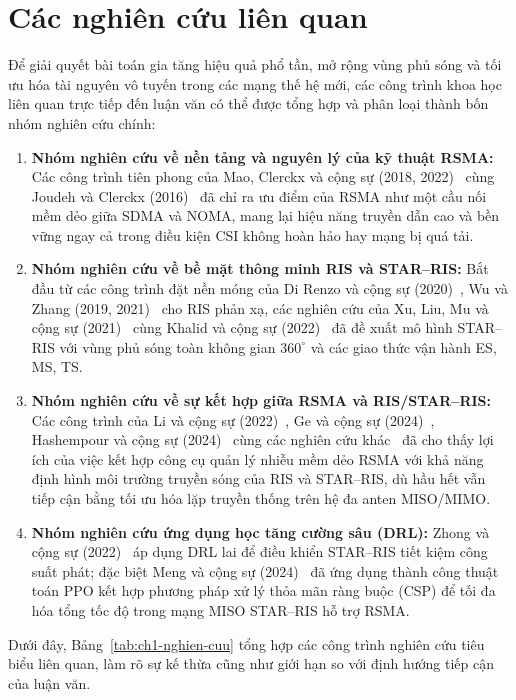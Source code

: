 \section{Các nghiên cứu liên quan}
\label{sec:nghien-cuu-lien-quan}

Để giải quyết bài toán gia tăng hiệu quả phổ tần, mở rộng vùng phủ sóng và tối ưu hóa tài nguyên vô tuyến
trong các mạng thế hệ mới, các công trình khoa học liên quan trực tiếp đến luận văn có thể được tổng hợp và
phân loại thành bốn nhóm nghiên cứu chính:
\begin{enumerate}
\item \textbf{Nhóm nghiên cứu về nền tảng và nguyên lý của kỹ thuật RSMA:} Các công trình tiên phong của
  Mao, Clerckx và cộng sự (2018, 2022)~\cite{Mao2018RSMABridging, Mao2022RSMAFundamentals} cùng Joudeh và
  Clerckx (2016)~\cite{Joudeh2016RSMASumRate} đã chỉ ra ưu điểm của RSMA như một cầu nối mềm dẻo giữa SDMA
  và NOMA, mang lại hiệu năng truyền dẫn cao và bền vững ngay cả trong điều kiện CSI không hoàn hảo hay mạng
  bị quá tải.
\item \textbf{Nhóm nghiên cứu về bề mặt thông minh RIS và STAR--RIS:} Bắt đầu từ các công trình đặt nền
  móng của Di Renzo và cộng sự (2020)~\cite{DiRenzo2020SmartRadio}, Wu và Zhang (2019,
  2021)~\cite{Wu2019IRSBeamforming, Wu2021IRSTutorial} cho RIS phản xạ, các nghiên cứu của Xu, Liu, Mu và
  cộng sự (2021)~\cite{Xu2021STARRIS, Mu2021STARAided} cùng Khalid và cộng sự
  (2022)~\cite{Khalid2022STARDesign} đã đề xuất mô hình STAR--RIS với vùng phủ sóng toàn không gian
  $360^\circ$ và các giao thức vận hành ES, MS, TS.
\item \textbf{Nhóm nghiên cứu về sự kết hợp giữa RSMA và RIS/STAR--RIS:} Các công trình của Li và cộng sự
  (2022)~\cite{Li2022RSMARISInterplay}, Ge và cộng sự (2024)~\cite{Ge2024RSMAMassiveMIMO}, Hashempour và
  cộng sự (2024)~\cite{Hashempour2024SecureSTARRS} cùng các nghiên cứu khác~\cite{Aboumahmoud2024RISRSMASurvey,
  Liu2024DiscretePhaseRSMARate, Maghrebi2024CooperativeActiveSTAR} đã cho thấy lợi ích của việc kết hợp
  công cụ quản lý nhiễu mềm dẻo RSMA với khả năng định hình môi trường truyền sóng của RIS và STAR--RIS, dù
  hầu hết vẫn tiếp cận bằng tối ưu hóa lặp truyền thống trên hệ đa anten MISO/MIMO.
\item \textbf{Nhóm nghiên cứu ứng dụng học tăng cường sâu (DRL):} Zhong và cộng sự
  (2022)~\cite{Zhong2022HybridRLSTAR} áp dụng DRL lai để điều khiển STAR--RIS tiết kiệm công suất phát; đặc
  biệt Meng và cộng sự (2024)~\cite{Meng2024PPOSTARRSMA} đã ứng dụng thành công thuật toán PPO kết hợp phương
  pháp xử lý thỏa mãn ràng buộc (CSP) để tối đa hóa tổng tốc độ trong mạng MISO STAR--RIS hỗ trợ RSMA.
\end{enumerate}
Dưới đây, Bảng~\ref{tab:ch1-nghien-cuu} tổng hợp các công trình nghiên cứu tiêu biểu liên quan, làm rõ sự
kế thừa cũng như giới hạn so với định hướng tiếp cận của luận văn.

